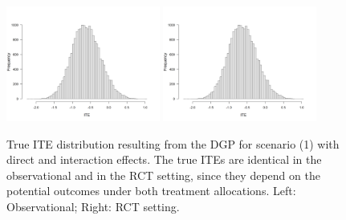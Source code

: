 \begin{figure}[htbp]
\centering
\includegraphics[width=0.45\textwidth]{img/results/observ_scenario1_ite_distribution_dgp.png}
\includegraphics[width=0.45\textwidth]{img/results/rct_scenario1_ite_distribution_dgp.png}
\caption{True ITE distribution resulting from the DGP for scenario (1) with direct and interaction effects. The true ITEs are identical in the observational and in the RCT setting, since they depend on the potential outcomes under both treatment allocations. Left: Observational; Right: RCT setting.}
\label{fig:scenario1_ite_distribution_dgp}
\end{figure}




